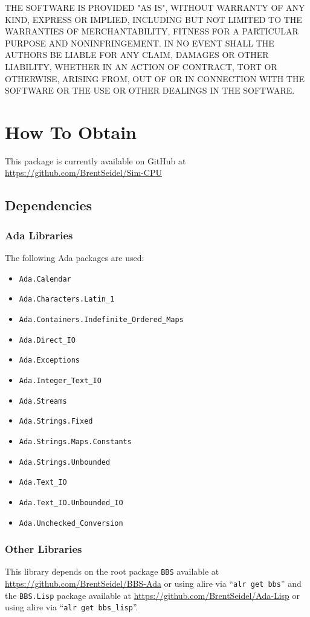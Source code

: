 \documentclass[10pt, openany]{book}
\newcommand{\package}[1]{\texttt{#1}}
\newcommand{\keyword}[1]{\texttt{#1}}
\begin{document}
THE SOFTWARE IS PROVIDED "AS IS", WITHOUT WARRANTY OF ANY KIND, EXPRESS OR IMPLIED, INCLUDING BUT NOT LIMITED TO THE WARRANTIES OF MERCHANTABILITY, FITNESS FOR A PARTICULAR PURPOSE AND NONINFRINGEMENT. IN NO EVENT SHALL THE AUTHORS BE LIABLE FOR ANY CLAIM, DAMAGES OR OTHER LIABILITY, WHETHER IN AN ACTION OF CONTRACT, TORT OR OTHERWISE, ARISING FROM, OUT OF OR IN CONNECTION WITH THE SOFTWARE OR THE USE OR OTHER DEALINGS IN THE SOFTWARE.

\chapter{How To Obtain}
This package is currently available on GitHub at \url{https://github.com/BrentSeidel/Sim-CPU}

\section{Dependencies}
\subsection{Ada Libraries}
The following Ada packages are used:
\begin{itemize}
  \item \package{Ada.Calendar}
  \item \package{Ada.Characters.Latin\_1}
  \item \package{Ada.Containers.Indefinite\_Ordered\_Maps}
  \item \package{Ada.Direct\_IO}
  \item \package{Ada.Exceptions}
  \item \package{Ada.Integer\_Text\_IO}
  \item \package{Ada.Streams}
  \item \package{Ada.Strings.Fixed}
  \item \package{Ada.Strings.Maps.Constants}
  \item \package{Ada.Strings.Unbounded}
  \item \package{Ada.Text\_IO}
  \item \package{Ada.Text\_IO.Unbounded\_IO}
  \item \package{Ada.Unchecked\_Conversion}
\end{itemize}


\subsection{Other Libraries}
This library depends on the root package \package{BBS} available at \url{https://github.com/BrentSeidel/BBS-Ada} or using alire via ``\keyword{alr get bbs}'' and the \package{BBS.Lisp} package available at \url{https://github.com/BrentSeidel/Ada-Lisp} or using alire via ``\keyword{alr get bbs\_lisp}''.
\end{document}
